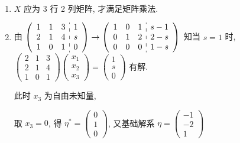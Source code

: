      \paragraph{} %
         \begin{enumerate}
             \item %
                   \( X \) 应为 3 行 2 列矩阵, 才满足矩阵乘法.
             \item %
                   由 \( \left(\begin{array}{ccc:c}
                           1 & 1 & 3 & 1 \\
                           2 & 1 & 4 & s \\
                           1 & 0 & 1 & 0
                       \end{array}\right)
                   \rightarrow
                   \left(\begin{array}{ccc:c}
                           1 & 0 & 1 & s-1 \\
                           0 & 1 & 2 & 2-s \\
                           0 & 0 & 0 & 1-s
                       \end{array}\right) \) 知当 \( s = 1 \) 时, \( \begin{pmatrix}
                       2 & 1 & 3 \\
                       2 & 1 & 4 \\
                       1 & 0 & 1
                   \end{pmatrix}\begin{pmatrix}
                       x_{1} \\
                       x_{2} \\
                       x_{3}
                   \end{pmatrix} = \begin{pmatrix}
                       1 \\
                       s \\
                       0
                   \end{pmatrix} \) 有解.

                   此时 \( x_{3} \) 为自由未知量,

                   取 \( x_{3} = 0 \), 得 \( \eta^{*} = \begin{pmatrix}
                       0 \\
                       1 \\
                       0
                   \end{pmatrix} \), 又基础解系 \( \eta = \begin{pmatrix}
                       -1 \\
                       -2 \\
                       1
                   \end{pmatrix} \)


\end{enumerate}
